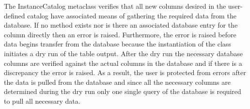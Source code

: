 \documentclass[]{article}
\begin{document}
The InstanceCatalog metaclass verifies that all new columns desired in the user-defined catalog have associated means of gathering the required data from the database. If no method exists nor is there an associated database entry for the column directly then an error is raised. Furthermore, the error is raised before data begins transfer from the database because the instantiation of the class initiates a dry run of the table output. After the dry run the necessary database columns are verified
against the actual columns in the database and if there is a discrepancy the error is raised. As a result, the user is protected from errors after the data is pulled from the database and since all the necessary columns are determined during the dry run only one single query of the database is required to pull all necessary data.
\end{document}
